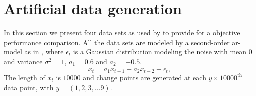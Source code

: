\section{Artificial data generation}\label{sec:artificial_data_generation}
In this section we present four data sets as used by \cite{camci2010change,takeuchi2006unifying} to provide for a objective performance comparison.
All the data sets are modeled by a second-order \gls{ar}-model as in , where $\epsilon_t$ is a Gaussian distribution modeling the noise with mean $0$ and variance $\sigma^2 = 1$, $a_1 = 0.6$ and $a_2 = -0.5$.
\begin{equation}\label{eq:artificial_data_sets_model}
  x_t = a_1 x_{t-1} + a_2 x_{t-2} + \epsilon_t,
\end{equation}
The length of $x_t$ is $10000$ and change points are generated at each $y \times 10000^\text{th}$ data point, with $y = (1, 2, 3, \dots 9)$.

